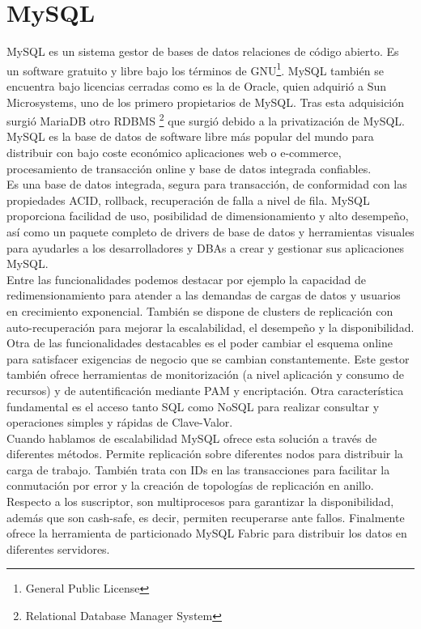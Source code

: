 \documentclass{article}
\begin{document}
\section{MySQL}
MySQL es un sistema gestor de bases de datos relaciones de código abierto. 
Es un software gratuito y libre bajo los términos de GNU\footnote{General Public License}. MySQL también se encuentra bajo licencias cerradas como es la de Oracle, quien adquirió a Sun Microsystems, uno de los primero propietarios de MySQL. Tras esta adquisición surgió MariaDB otro RDBMS \footnote{Relational Database Manager System} que surgió debido a la privatización de MySQL.\\

MySQL es la base de datos de software libre más popular del mundo para distribuir con bajo coste económico aplicaciones web o e-commerce, procesamiento de transacción online y base de datos integrada confiables.  \\
Es una base de datos integrada, segura para transacción, de conformidad con las propiedades ACID, rollback, recuperación de falla a nivel de fila. MySQL proporciona facilidad de uso, posibilidad de dimensionamiento y alto desempeño, así como un paquete completo de drivers de base de datos y herramientas visuales para ayudarles a los desarrolladores y DBAs a crear y gestionar sus aplicaciones MySQL. \\

Entre las funcionalidades podemos destacar por ejemplo la capacidad de redimensionamiento para atender a las demandas de cargas de datos y usuarios en crecimiento exponencial. También se dispone de clusters de replicación con auto-recuperación para mejorar la escalabilidad, el desempeño y la disponibilidad.\\
Otra de las funcionalidades destacables es el poder cambiar el esquema online para satisfacer exigencias de negocio que se cambian constantemente. Este gestor también ofrece herramientas de monitorización (a nivel aplicación y consumo de recursos) y de autentificación mediante PAM y encriptación.
Otra característica fundamental es el acceso tanto SQL como NoSQL para realizar consultar y operaciones simples y rápidas de Clave-Valor.\\

Cuando hablamos de escalabilidad MySQL ofrece esta solución a través de diferentes métodos. Permite replicación sobre diferentes nodos para distribuir la carga de trabajo. También trata con IDs en las transacciones para facilitar la conmutación por error y la creación de topologías de replicación en anillo. Respecto a los suscriptor, son multiprocesos para garantizar la disponibilidad, además que son cash-safe, es decir, permiten recuperarse ante fallos. Finalmente ofrece la herramienta de particionado MySQL Fabric para distribuir los datos en diferentes servidores.\cite{lock}\\
\end{document}
